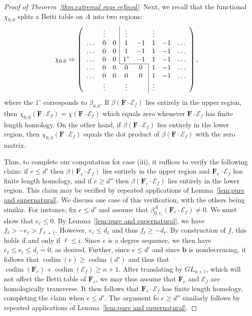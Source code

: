 \documentclass[12pt]{amsart}
\theoremstyle{definition}
\theoremstyle{remark}
\newcommand{\codim}{\operatorname{codim}}
\newcommand{\bb}{\mathbf{b}}
\newcommand{\cE}{\mathcal{E}}
\newcommand{\FF}{\mathbf{F}}
\newcommand{\GL}{{GL}}
\begin{document}
\begin{proof}[Proof of Theorem~\ref{thm:extremal rays refined}]
Next, we recall that the functional $\chi_{0,0}$ splits a Betti table on $A$ into two regions:
\[
\chi_{0,0}\Rightarrow 
\left(
\begin{array}{cccccccc}
 & \vdots& &\multicolumn{1}{|c}{\vdots}&& \vdots&&\\
\dots&0&0&\multicolumn{1}{|c}{1}&-1&1&-1&\dots\\
\dots&0&0&\multicolumn{1}{|c}{1}&-1&1&-1&\dots\\
\dots&0&0&\multicolumn{1}{|c}{1^\circ}&-1&1&-1&\dots\\ \cline{4-5}
\dots&0&0&0&0&\multicolumn{1}{|c}{1}&-1&\dots\\
\dots&0&0&0&0&\multicolumn{1}{|c}{1}&-1&\dots\\
& \vdots&&\vdots&& \multicolumn{1}{|c}{\vdots}&&\\
\end{array}
\right),
\]
where the $1^\circ$ corresponds to $\beta_{0,0}$.   If $\beta(\FF\cdot \cE_f)$ lies entirely in the upper region, then $\chi_{0,0}(\FF\cdot \cE_f)=\chi(\FF\cdot \cE_f)$ which equals zero whenever $\FF\cdot \cE_f$ has finite length homology.  On the other hand, if $\beta(\FF\cdot \cE_f)$ lies entirely in the lower region, then $\chi_{0,0}(\FF\cdot \cE_f)$ equals the dot product of $\beta(\FF\cdot \cE_f)$ with the zero matrix.

Thus, to complete our computation for case (iii), it suffices to verify the following claim: if $e\leq d'$ then $\beta(\FF_c\cdot \cE_f)$ lies entirely in the upper region and $\FF_e\cdot \cE_f$ has finite length homology, and if $e\geq d''$ then $\beta(\FF_e\cdot \cE_f)$ lies entirely in the lower region.  This claim may be verified by repeated applications of Lemma~\ref{lem:pure and supernatural}.  We discuss one case of this verification, with the others being similar.  For instance, fix $e\leq d'$ and assume that $\beta_{0,e_\ell}^A(\FF_e\cdot \cE_f)\ne 0$.  We must show that $e_{\ell}\leq 0$.  By Lemma~\ref{lem:pure and supernatural}, we have
$
f_{\ell}>-e_{\ell}>f_{\ell+1}.
$
However, $e_{\ell}\leq d_{\ell}$ and thus $f_{\ell}\geq -d_{\ell}$.  By construction of $f$, this holds if and only if $\ell \leq i$.  Since $e$ is a degree sequence, we then have $e_{\ell}\leq e_i\leq d_i=0$, as desired.  Further, since $e\leq d'$ and since $\bb$ is nondecreasing, it follows that $\codim(e)\geq \codim(d')$ and thus that $\codim(\FF_e)+\codim(\cE_f)\geq n+1$.  After translating by $\GL_{n+1}$, which will not affect the Betti table of $\FF_e$, we may thus assume that $\FF_e$ and $\cE_f$ are homologically transverse.  It then follows that $\FF_e\cdot \cE_f$ has finite length homology, completing the claim when $e\leq d'$.  The argument fo $e\geq d''$ similarly follows by repeated applications of Lemma~\ref{lem:pure and supernatural}.


\end{proof}
\end{document}
